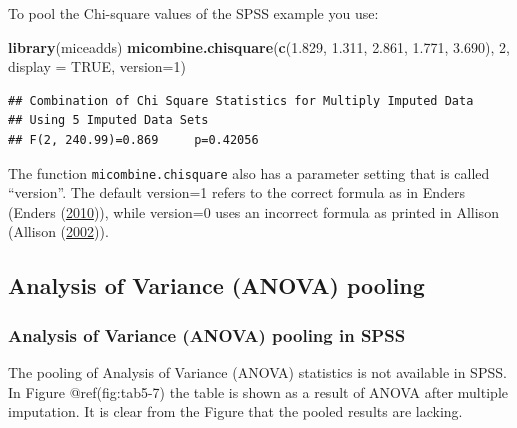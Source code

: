 \documentclass[
]{book}
\newenvironment{Shaded}{\begin{snugshade}}{\end{snugshade}}
\newcommand{\DataTypeTok}[1]{\textcolor[rgb]{0.13,0.29,0.53}{#1}}
\newcommand{\DecValTok}[1]{\textcolor[rgb]{0.00,0.00,0.81}{#1}}
\newcommand{\FloatTok}[1]{\textcolor[rgb]{0.00,0.00,0.81}{#1}}
\newcommand{\KeywordTok}[1]{\textcolor[rgb]{0.13,0.29,0.53}{\textbf{#1}}}
\newcommand{\NormalTok}[1]{#1}
\newcommand{\OtherTok}[1]{\textcolor[rgb]{0.56,0.35,0.01}{#1}}
\begin{document}
To pool the Chi-square values of the SPSS example you use:

\begin{Shaded}
\begin{Highlighting}[]
\KeywordTok{library}\NormalTok{(miceadds)}
\KeywordTok{micombine.chisquare}\NormalTok{(}\KeywordTok{c}\NormalTok{(}\FloatTok{1.829}\NormalTok{, }\FloatTok{1.311}\NormalTok{, }\FloatTok{2.861}\NormalTok{, }\FloatTok{1.771}\NormalTok{, }\FloatTok{3.690}\NormalTok{), }\DecValTok{2}\NormalTok{, }\DataTypeTok{display =} \OtherTok{TRUE}\NormalTok{, }\DataTypeTok{version=}\DecValTok{1}\NormalTok{)}
\end{Highlighting}
\end{Shaded}

\begin{verbatim}
## Combination of Chi Square Statistics for Multiply Imputed Data
## Using 5 Imputed Data Sets
## F(2, 240.99)=0.869     p=0.42056
\end{verbatim}

The function \texttt{micombine.chisquare} also has a parameter setting
that is called ``version''. The default version=1 refers to the correct
formula as in Enders (Enders
(\protect\hyperlink{ref-enders2010applied}{2010})), while version=0 uses
an incorrect formula as printed in Allison (Allison
(\protect\hyperlink{ref-Allison2002}{2002})).

\hypertarget{analysis-of-variance-anova-pooling}{%
\subsection{Analysis of Variance (ANOVA)
pooling}\label{analysis-of-variance-anova-pooling}}

\hypertarget{analysis-of-variance-anova-pooling-in-spss}{%
\subsubsection{Analysis of Variance (ANOVA) pooling in
SPSS}\label{analysis-of-variance-anova-pooling-in-spss}}

The pooling of Analysis of Variance (ANOVA) statistics is not available
in SPSS. In Figure @ref(fig:tab5-7) the table is shown as a result of
ANOVA after multiple imputation. It is clear from the Figure that the
pooled results are lacking.
\end{document}

